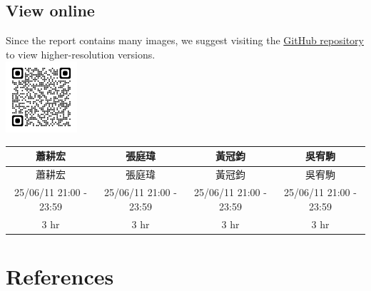 \documentclass[12pt]{article}
\begin{document}
    \subsection{View online}
    Since the report contains many images, we suggest visiting the \href{https://github.com/CSIEHaTerX/Dr.UML/}{GitHub repository} to view higher-resolution versions.\\
    \includegraphics[]{assets/repoQRCode}
    \\

    \begin{CJK*}{UTF8}{bsmi}
        \begin{longtable}{c|c|c|c|}
            \hline
            蕭耕宏                    & 張庭瑋                    & 黃冠鈞                    & 吳宥駒                    \\
            \hline
            \endfirsthead
            \hline
            蕭耕宏                    & 張庭瑋                    & 黃冠鈞                    & 吳宥駒                    \\
            \hline
            \endhead
            \hline
            25/06/11 21:00 - 23:59 & 25/06/11 21:00 - 23:59 & 25/06/11 21:00 - 23:59 & 25/06/11 21:00 - 23:59 \\
            \hline
            3 hr                   & 3 hr                   & 3 hr                   & 3 hr                   \\
            \hline
        \end{longtable}
    \end{CJK*}



    \section*{References}

    \printbibliography[heading=none]
\end{document}
